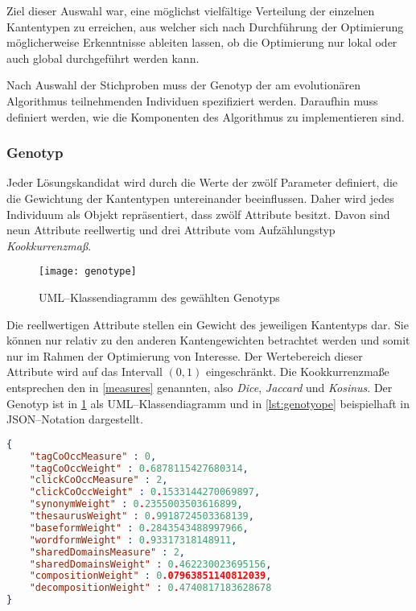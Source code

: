 Ziel dieser Auswahl war, eine möglichst vielfältige Verteilung der einzelnen Kantentypen zu erreichen, aus welcher sich nach Durchführung der Optimierung möglicherweise Erkenntnisse ableiten lassen, ob die Optimierung nur lokal oder auch global durchgeführt werden kann.

Nach Auswahl der Stichproben muss der Genotyp der am evolutionären Algorithmus teilnehmenden Individuen spezifiziert werden. Daraufhin muss definiert werden, wie die Komponenten des Algorithmus zu implementieren sind.

\subsubsection{Genotyp}

Jeder Lösungskandidat wird durch die Werte der zwölf Parameter definiert, die die Gewichtung der Kantentypen untereinander beeinflussen. Daher wird jedes Individuum als Objekt repräsentiert, dass zwölf Attribute besitzt. Davon sind neun Attribute reellwertig und drei Attribute vom Aufzählungstyp \emph{Kookkurrenzmaß}.

\begin{figure}
\centering
\texttt{[image: genotype]}
\caption{UML--Klassendiagramm des gewählten Genotyps}
\label{fig:genotype}
\end{figure}

Die reellwertigen Attribute stellen ein Gewicht des jeweiligen Kantentyps dar. Sie können nur relativ zu den anderen Kantengewichten betrachtet werden und somit nur im Rahmen der Optimierung von Interesse. Der Wertebereich dieser Attribute wird auf das Intervall \((0,1)\) eingeschränkt. Die Kookkurrenzmaße entsprechen den in \cref{measures} genannten, also \emph{Dice}, \emph{Jaccard} und \emph{Kosinus}. Der Genotyp ist in \cref{fig:genotype} als UML--Klassendiagramm und in \cref{lst:genotyope} beispielhaft in JSON--Notation dargestellt.

\begin{lstlisting}[language=json, label={lst:genotyope}, caption={Beispiel für ein Individuum}]
{
    "tagCoOccMeasure" : 0,
    "tagCoOccWeight" : 0.6878115427680314,
    "clickCoOccMeasure" : 2,
    "clickCoOccWeight" : 0.1533144270069897,
    "synonymWeight" : 0.2355003503616899,
    "thesaurusWeight" : 0.9918724503368139,
    "baseformWeight" : 0.2843543488997966,
    "wordformWeight" : 0.93317318148911,
    "sharedDomainsMeasure" : 2,
    "sharedDomainsWeight" : 0.462230023695156,
    "compositionWeight" : 0.07963851140812039,
    "decompositionWeight" : 0.4740817183628678
}
\end{lstlisting}

